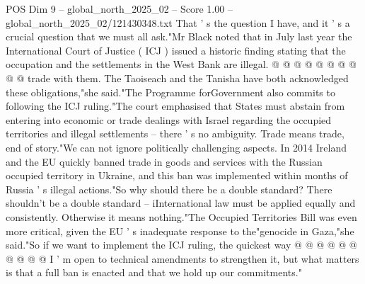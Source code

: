 \begin{textsample}{POS Dim 9 – global\_north\_2025\_02 – Score 1.00 – global\_north\_2025\_02/121430348.txt}
That ' s the question I have, and it ' s a crucial question that we must all ask."Mr Black noted that in July last year the International Court of Justice ( ICJ ) issued a historic finding stating that the occupation and the settlements in the West Bank are illegal. @ @ @ @ @ @ @ @ @ @ trade with them.
The Taoiseach and the Tanisha have both acknowledged these obligations,"she said."The Programme forGovernment also commits to following the ICJ ruling."The court emphasised that States must abstain from entering into economic or trade dealings with Israel regarding the occupied territories and illegal settlements -- there ' s no ambiguity.
Trade means trade, end of story."We can not ignore politically challenging aspects.
In 2014 Ireland and the EU quickly banned trade in goods and services with the Russian occupied territory in Ukraine, and this ban was implemented within months of Russia ' s illegal actions."So why should there be a double standard?
There shouldn't be a double standard -- iInternational law must be applied equally and consistently.
Otherwise it means nothing."The Occupied Territories Bill was even more critical, given the EU ' s inadequate response to the"genocide in Gaza,"she said."So if we want to implement the ICJ ruling, the quickest way @ @ @ @ @ @ @ @ @ @ I ' m open to technical amendments to strengthen it, but what matters is that a full ban is enacted and that we hold up our commitments."

\end{textsample}
